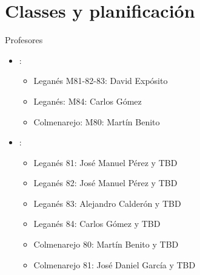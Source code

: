 \section{Classes y planificación}

\begin{frame}[t]{Profesores}
\begin{itemize}
  \item {}: 
    \begin{itemize}
      \item Leganés M81-82-83: David Expósito
      \item Leganés: M84: Carlos Gómez
      \item Colmenarejo: M80: Martín Benito
    \end{itemize}
  \item {}: 
    \begin{itemize}
      \item Leganés 81: José Manuel Pérez y TBD
      \item Leganés 82: José Manuel Pérez y TBD
      \item Leganés 83: Alejandro Calderón y TBD
      \item Leganés 84: Carlos Gómez y TBD
      \item Colmenarejo 80: Martín Benito y TBD
      \item Colmenarejo 81: José Daniel García y TBD
    \end{itemize}
\end{itemize}
\end{frame}

